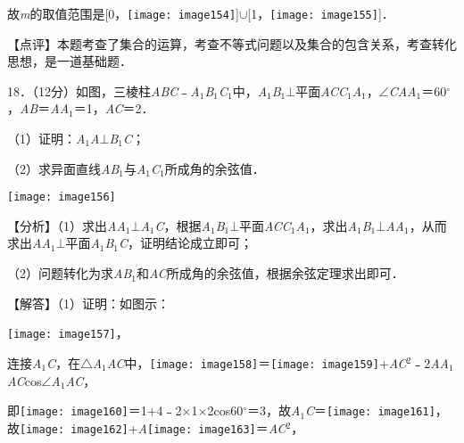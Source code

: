 \documentclass[a4paper,11pt,UTF8,twoside]{ctexart} %
\begin{document}
故\textit{m}的取值范围是[0，\texttt{[image: image154]}]$\mathrm{\cup}$[1，\texttt{[image: image155]}]．

【点评】本题考查了集合的运算，考查不等式问题以及集合的包含关系，考查转化思想，是一道基础题．

18．（12分）如图，三棱柱\textit{ABC}﹣\textit{A}${}_{1}$\textit{B}${}_{1}$\textit{C}${}_{1}$中，\textit{A}${}_{1}$\textit{B}${}_{1}$$\mathrm{\bot}$平面\textit{ACC}${}_{1}$\textit{A}${}_{1}$，$\mathrm{\angle}$\textit{CAA}${}_{1}$＝60$\mathrm{{}^\circ}$，\textit{AB}＝\textit{AA}${}_{1}$＝1，\textit{AC}＝2．

（1）证明：\textit{A}${}_{1}$\textit{A}$\mathrm{\bot}$\textit{B}${}_{1}$\textit{C}；

（2）求异面直线\textit{AB}${}_{1}$与\textit{A}${}_{1}$\textit{C}${}_{1}$所成角的余弦值．

\texttt{[image: image156]}

【分析】（1）求出\textit{AA}${}_{1}$$\mathrm{\bot}$\textit{A}${}_{1}$\textit{C}，根据\textit{A}${}_{1}$\textit{B}${}_{1}$$\mathrm{\bot}$平面\textit{ACC}${}_{1}$\textit{A}${}_{1}$，求出\textit{A}${}_{1}$\textit{B}${}_{1}$$\mathrm{\bot}$\textit{AA}${}_{1}$，从而求出\textit{AA}${}_{1}$$\mathrm{\bot}$平面\textit{A}${}_{1}$\textit{B}${}_{1}$\textit{C}，证明结论成立即可；

（2）问题转化为求\textit{AB}${}_{1}$和\textit{AC}所成角的余弦值，根据余弦定理求出即可．

【解答】（1）证明：如图示：

\texttt{[image: image157]}，

连接\textit{A}${}_{1}$\textit{C}，在$\mathrm{\triangle}$\textit{A}${}_{1}$\textit{AC}中，\texttt{[image: image158]}＝\texttt{[image: image159]}+\textit{AC}${}^{2}$﹣2\textit{AA}${}_{1}$\textit{AC}cos$\mathrm{\angle}$\textit{A}${}_{1}$\textit{AC}，

即\texttt{[image: image160]}＝1+4﹣2$\mathrm{\times}$1$\mathrm{\times}$2cos60$\mathrm{{}^\circ}$＝3，故\textit{A}${}_{1}$\textit{C}＝\texttt{[image: image161]}，故\texttt{[image: image162]}+\textit{A}\texttt{[image: image163]}＝\textit{AC}${}^{2}$，
\end{document}
